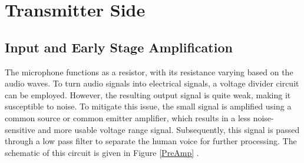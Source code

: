\documentclass[a4paper,10pt]{IEEEtran}
\begin{document}
\section{Transmitter Side}
\subsection{Input and Early Stage Amplification}
The microphone functions as a resistor, with its resistance varying based on the audio waves. To turn audio signals into electrical signals, a voltage divider circuit can be employed. However, the resulting output signal is quite weak, making it susceptible to noise. To mitigate this issue, the small signal is amplified using a common source or common emitter amplifier, which results in a less noise-sensitive and more usable voltage range signal. Subsequently, this signal is passed through a low pass filter to separate the human voice for further processing. The schematic of this circuit is given in Figure \ref{PreAmp} .
\end{document}
